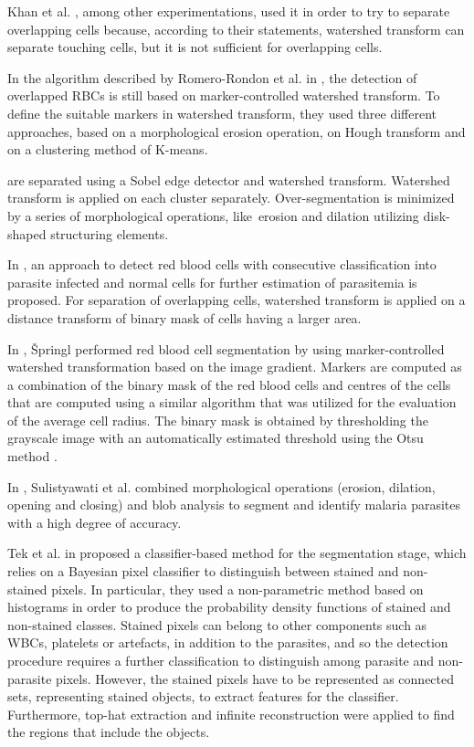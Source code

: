 \documentclass[sensors,review,accept,moreauthors,pdftex,10pt,a4paper]{mdpi}
\begin{document}
Khan et al. \cite{Khan2011}, among other experimentations, used it in order to try to separate overlapping cells because, according to their statements, watershed transform can separate touching cells, but it is not sufficient for overlapping cells.

In the algorithm described by Romero-Rondon et al. in \cite{Romero2016}, the detection of overlapped RBCs is still based on marker-controlled watershed transform. To define the suitable markers in watershed transform, they used three different approaches, based on a morphological erosion operation, on Hough transform and on a clustering method of K-means.

 are separated using a Sobel edge detector and watershed transform. Watershed transform is applied on each cluster separately. Over-segmentation is minimized by a series of morphological operations, like~erosion and dilation utilizing disk-shaped structuring elements.

In \cite{Savkare2011a}, an approach  to detect red blood cells with consecutive classification into parasite infected and normal cells for further estimation of parasitemia is proposed. For separation of overlapping cells, watershed transform is applied on a distance transform of binary mask of cells having a larger area.

In \cite{Springl2009}, {\v{S}}pringl performed red blood cell segmentation by using marker-controlled watershed transformation based on the image gradient. Markers are computed as a combination of the binary mask of the red blood cells and centres of the cells that are computed using a similar algorithm that was utilized for the evaluation of the average cell radius. The binary mask is obtained by thresholding the grayscale image with an automatically estimated threshold using the Otsu method \cite{Otsu1975}.

In \cite{Sulist2015}, Sulistyawati et al. combined morphological operations (erosion, dilation, opening and closing) and blob analysis to segment and identify malaria parasites with a high degree of accuracy.

Tek et al. in \cite{Tek2006} proposed a classifier-based method for the segmentation stage, which relies on a Bayesian pixel classifier to distinguish between stained and non-stained pixels. In particular, they used a non-parametric method based on histograms in order to produce the probability density functions of stained and non-stained classes. Stained pixels can belong to other components such as WBCs, platelets or artefacts, in addition to the parasites, and so the detection procedure requires a further classification to distinguish among parasite and non-parasite pixels. However, the stained pixels have to be represented as connected sets, representing stained objects, to extract features for the classifier. Furthermore, top-hat extraction and infinite reconstruction were applied to find the regions that include the objects.
\end{document}
